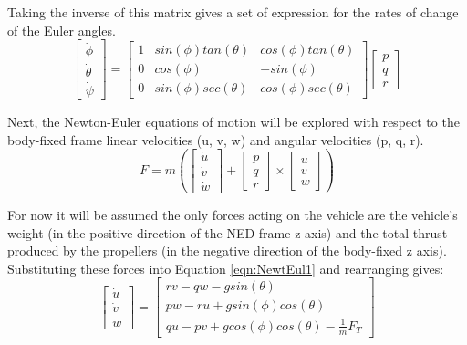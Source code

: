 Taking the inverse of this matrix gives a set of expression for the rates of change of the Euler angles. 
\begin{equation}\label{eqn:state1}
\begin{bmatrix}
\dot{\phi}\\ \dot{\theta} \\ \dot{\psi}
\end{bmatrix} 
=
\begin{bmatrix}
1 & sin(\phi)tan(\theta) & cos(\phi)tan(\theta)\\
0 & cos(\phi) & -sin(\phi)\\
0 & sin(\phi)sec(\theta) & cos(\phi)sec(\theta)
\end{bmatrix}
\begin{bmatrix}
p\\q\\r
\end{bmatrix} 
\end{equation}


Next, the Newton-Euler equations of motion will be explored with respect to the body-fixed frame linear velocities (u, v, w) and angular velocities (p, q, r).
\begin{equation}\label{eqn:NewtEul1}
F=m\left(
\begin{bmatrix}
\dot{u}\\\dot{v}\\\dot{w}
\end{bmatrix}
+
\begin{bmatrix}
p\\q\\r
\end{bmatrix}
\times
\begin{bmatrix}
u\\v\\w
\end{bmatrix}
\right)
\end{equation}



For now it will be assumed the only forces acting on the vehicle are the vehicle's weight (in the positive direction of the NED frame z axis) and the total thrust produced by the propellers (in the negative direction of the body-fixed z axis). Substituting these forces into Equation \eqref{eqn:NewtEul1} and rearranging gives:
\begin{equation}\label{eqn:state2}
\begin{bmatrix}
\dot{u}\\\dot{v}\\\dot{w}
\end{bmatrix}
= 
\begin{bmatrix}
rv-qw-gsin(\theta)\\
pw-ru+gsin(\phi)cos(\theta)\\
qu-pv+gcos(\phi)cos(\theta)-\frac{1}{m}F_{T}
\end{bmatrix}
\end{equation}

